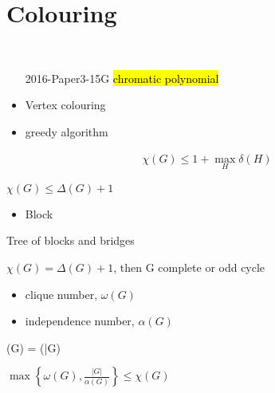 \section{Colouring}\label{sec:colouring}

\begin{exam}
    \,
    \begin{enumerate}
        \item[2016-Paper3-15G] \hl{chromatic polynomial}
    \end{enumerate}
\end{exam}

\begin{itemize}
    \item Vertex colouring
    \item greedy algorithm
\end{itemize}

\begin{thm}
    \begin{align*}
        \chi(G) \leq 1 + \max_H \delta(H)
    \end{align*}
\end{thm}

\begin{cor}
    $\chi(G) \leq \Delta(G) + 1$
\end{cor}

\begin{itemize}
    \item Block
\end{itemize}

\begin{fact}
    Tree of blocks and bridges
\end{fact}

\begin{thm}[Brooks]
    $\chi (G) = \Delta(G) + 1$, then G complete or odd cycle
\end{thm}

\begin{itemize}
    \item clique number, $\omega(G)$
    \item independence number, $\alpha(G)$
\end{itemize}

\begin{fact}
    \alpha(G) = \omega(\bar{G})
\end{fact}

\begin{fact}
    $\max \left\{ \omega(G), \frac{|G|}{\alpha(G)} \right\} \leq \chi(G)$
\end{fact}


